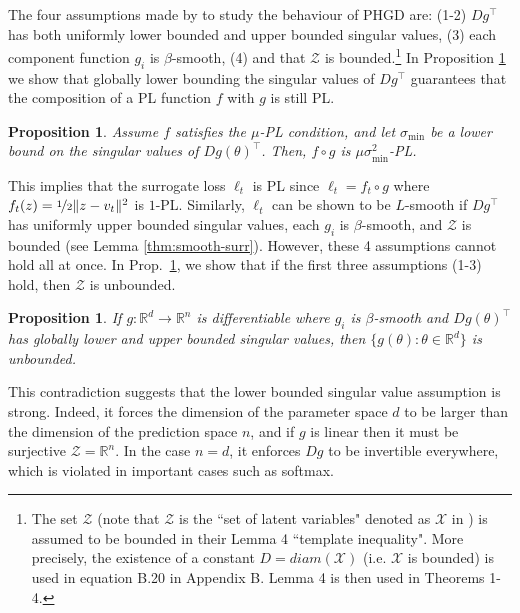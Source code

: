 \documentclass{article} %
\newtheorem{proposition}[theorem]{Proposition}
\theoremstyle{definition}
\newcommand{\reals}{\mathbb{R}}
\begin{document}
 The four assumptions made by \citet{sakos2024exploiting} to study the behaviour of PHGD are: (1-2) $Dg^\top$ has both uniformly lower bounded and upper bounded singular values, (3) each component function $g_i$ is $\beta$-smooth, (4) and that $\mathcal{Z}$ is bounded.\footnote{
 The set $\mathcal{Z}$ (note that $\mathcal{Z}$ is the ``set of latent variables" denoted as $\mathcal{X}$ in  \citet{sakos2024exploiting}) is assumed to be bounded in their Lemma 4 ``template inequality". More precisely, the existence of a constant $D = diam(\mathcal{X})$ (i.e. $\mathcal{X}$ is bounded) is used in equation B.20 in Appendix B. Lemma 4 is then used in Theorems 1-4. 
 }
In Proposition \ref{thm:pl} we show that globally lower bounding the singular values of $Dg^\top$ guarantees that the composition of a PL function $f$ with $g$ is still PL.
\begin{proposition}\label{thm:pl}
    Assume $f$ satisfies the $\mu$-PL condition, and let $\sigma_{\min}$ be a lower bound on the singular values of $Dg(\theta)^\top$. Then, $f \circ g$ is $\mu \sigma^2_{\min}$-PL.
\end{proposition}
This implies that the surrogate loss $\ell_t$ is PL since $\ell_t = f_t \circ g$ where $f_t(z) = \nicefrac{1}{2}\|z-v_t\|^2$ is $1$-PL.
Similarly, $\ell_t$ can be shown to be $L$-smooth if $Dg^\top$ has uniformly upper bounded singular values, each $g_i$ is $\beta$-smooth, and $\mathcal{Z}$ is bounded (see Lemma \ref{thm:smooth-surr}).
However, these 4 assumptions cannot hold all at once. In Prop.~\ref{thm:unbounded}, we show that if the first three assumptions (1-3) hold, then $\mathcal{Z}$ is unbounded.
\begin{proposition}\label{thm:unbounded}
    If $g: \reals^d \to \reals^n$ is differentiable where $g_i$ is $\beta$-smooth and $Dg(\theta)^\top$ has globally lower and upper bounded singular values, then $\{g(\theta): \theta\in \reals^d\}$ is unbounded.
\end{proposition}

This contradiction suggests that the lower bounded singular value assumption is strong.
Indeed, it forces the dimension of the parameter space $d$ to be larger than the dimension of the prediction space $n$, and if $g$ is linear then it must be surjective $\mathcal{Z} = \reals^n$.
In the case $n=d$, it enforces $Dg$ to be invertible everywhere, which is violated in important cases such as softmax. 
\end{document}
